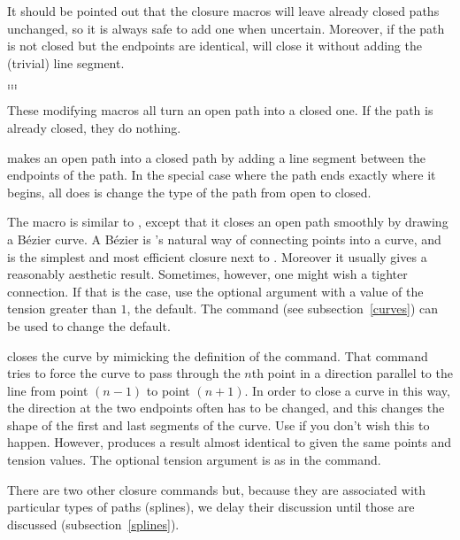\documentclass[letterpaper]{article}
\begin{document}
It should be pointed out that the closure macros will leave already
closed paths unchanged, so it is always safe to add one when uncertain.
Moreover, if the path is not closed but the endpoints are identical,
 will close it without adding the (trivial) line segment.


\begin{cd}
$\ldots$\\
$\ldots$\\
$\ldots$%
%
\end{cd}

These modifying macros all turn an open path into a closed one. If the
path is already closed, they do nothing.

 makes an open path into a closed path by adding a line
segment between the endpoints of the path. In the special case where
the path ends exactly where it begins, all  does is change
the type of the path from open to closed.

The  macro is similar to , except that it closes
an open path smoothly by drawing a B\'ezier curve. A B\'ezier is \MF{}'s
natural way of connecting points into a curve, and  is the
simplest and most efficient closure next to . Moreover it
usually gives a reasonably aesthetic result. Sometimes, however, one
might wish a tighter connection. If that is the case, use the optional
argument with a value of the tension  greater than $1$, the
default. The command  (see subsection~\ref{curves}) can
be used to change the default.

 closes the curve by mimicking the definition of the
 command. That command tries to force the curve to pass
through the $n$th point in a direction parallel to the line from point
$(n-1)$ to point $(n+1)$. In order to close a curve in this way, the
direction at the two endpoints often has to be changed, and this changes
the shape of the first and last segments of the curve. Use 
if you don't wish this to happen. However, 
produces a result almost identical to  given the same points
and tension values. The optional tension argument is as in the
 command.

There are two other closure commands but, because they are associated
with particular types of paths (splines), we delay their discussion
until those are discussed (subsection~\ref{splines}).
\end{document}
